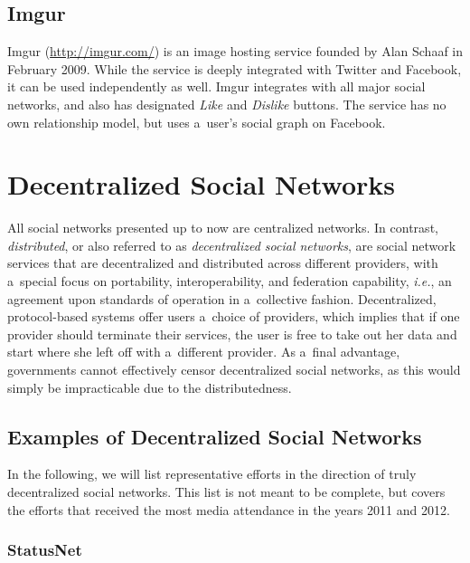 \subsection{Imgur}

Imgur (\url{http://imgur.com/})
is an image hosting service
founded by Alan Schaaf in February 2009.
While the service is deeply integrated with Twitter
and Facebook, it can be used independently as well.
Imgur integrates with all major social networks,
and also has designated \emph{Like} and \emph{Dislike} buttons.
The service has no own relationship model,
but uses a~user's social graph on Facebook.

\section{Decentralized Social Networks}
All social networks presented up to now are centralized networks.
In contrast, \emph{distributed}, or also referred to as
\emph{decentralized social networks}, are
social network services that are decentralized and distributed
across different providers, with a~special focus on
portability, interoperability, and federation capability,
\emph{i.e.}, an agreement upon standards of operation
in a~collective fashion.
Decentralized, protocol-based systems
offer users a~choice of providers, which implies
that if one provider should terminate their services,
the user is free to take out her data and start
where she left off with a~different provider.
As a~final advantage, governments cannot effectively censor
decentralized social networks,
as this would simply be impracticable due to the distributedness.

\subsection{Examples of Decentralized Social Networks}

In the following, we will list representative efforts 
in the direction of truly decentralized social networks.
This list is not meant to be complete,
but covers the efforts that received the most media attendance
in the years 2011 and 2012.

\subsubsection{StatusNet}

